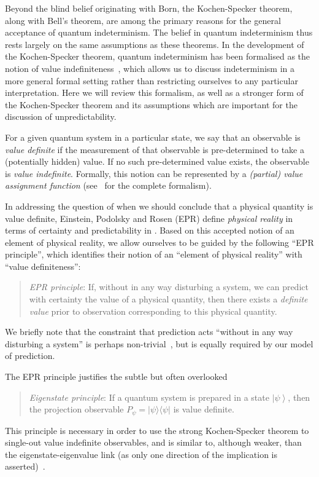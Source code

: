 \documentclass[%
 superscriptaddress,
 preprint,
 showpacs,
 showkeys,
 preprintnumbers,
  amsmath,amssymb,
  aps,
 pra,
  longbibliography,
  floatfix,
 ]{revtex4-1}
\theoremstyle{definition}
\newcommand{\ket}[1]{\left| #1 \right>}
\newcommand{\oprod}[2]{| #1 \rangle\langle #2 |}
\begin{document}
Beyond the blind belief originating with Born, the Kochen-Specker theorem, along with Bell's theorem, are among the primary reasons for the general acceptance of quantum indeterminism.
The belief in quantum indeterminism thus rests largely on the same assumptions as these theorems.
In the development of the Kochen-Specker theorem, quantum indeterminism has been formalised as the notion of value indefiniteness~\cite{2012-incomput-proofsCJ}, which allows us to discuss indeterminism in a more general formal setting rather than restricting ourselves to any particular interpretation.
Here we will review this formalism, as well as a stronger form of the Kochen-Specker theorem and its assumptions which are important for the discussion of unpredictability.

For a given quantum system in a particular state, we say that an observable is \emph{value definite} if the measurement of that observable is pre-determined to take a (potentially hidden) value.
If no such pre-determined value exists, the observable is \emph{value indefinite}.
Formally, this notion can be represented by a {\em (partial) value assignment function} (see~\cite{2012-incomput-proofsCJ} for the complete formalism).

In addressing the question of when we should conclude that a physical quantity is value definite, Einstein, Podolsky and Rosen (EPR)  define {\em physical reality} in terms of certainty and predictability in \cite[p.~777]{epr}.
Based on this accepted notion of an element of physical reality, we allow ourselves to be guided by the following  ``EPR principle'', which identifies their notion of an ``element of physical reality'' with ``value definiteness'':
\begin{quote}
	{\em EPR principle}: If, without in any way disturbing a system, we can predict with certainty the value of a physical quantity, then there exists a \emph{definite value} prior to observation corresponding to this physical quantity.
\end{quote}

We briefly note that the constraint that prediction acts ``without in any way disturbing a system'' is perhaps non-trivial~\cite{laloe-2012}, but is equally required by our model of prediction.

The EPR principle justifies the subtle but often overlooked 
\begin{quote}\emph{Eigenstate principle}:
If a quantum system is prepared in a state $\ket{\psi}$, then the projection observable $P_\psi=\oprod{\psi}{\psi}$ is value definite.
\end{quote}
This principle is necessary in order to use the strong Kochen-Specker theorem to single-out value indefinite observables, and is similar to, although weaker, than the eigenstate-eigenvalue link (as only one direction of the implication is asserted)~\cite{Suarez:2004gn}.
\end{document}
